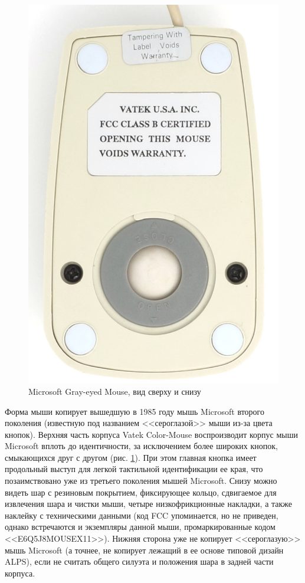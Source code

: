 \documentclass[11pt, a4paper]{article}
\begin{document}
\begin{figure}[h]
    \includegraphics[scale=0.55]{1989_vatek_color_mouse/bottom_30.jpg}
    \caption{Microsoft Gray-eyed Mouse, вид сверху и снизу}
    \label{fig:VatekColorTopAndBottom}
\end{figure}

Форма мыши копирует вышедшую в 1985 году мышь Microsoft второго поколения (известную под названием <<сероглазой>> мыши из-за цвета кнопок). Верхняя часть корпуса Vatek Color-Mouse воспроизводит корпус мыши Microsoft вплоть до идентичности, за исключением более широких кнопок, смыкающихся друг с другом (рис. \ref{fig:VatekColorTopAndBottom}). При этом главная кнопка имеет продольный выступ для легкой тактильной идентификации ее края, что позаимствовано уже из третьего поколения мышей Microsoft.
Снизу можно видеть шар с резиновым покрытием, фиксирующее кольцо, сдвигаемое для извлечения шара и чистки мыши, четыре низкофрикционные накладки, а также наклейку с техническими данными (код FCC упоминается, но не приведен, однако встречаются и экземпляры данной мыши, промаркированные кодом <<E6Q5J8MOUSEX11>>). Нижняя сторона уже не копирует <<сероглазую>> мышь Microsoft (а точнее, не копирует лежащий в ее основе типовой дизайн ALPS), если не считать общего силуэта и положения шара в задней части корпуса.
\end{document}
